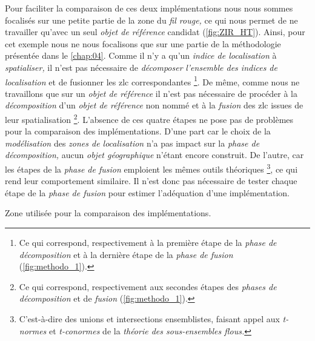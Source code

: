 Pour faciliter la comparaison de ces deux implémentations nous nous
sommes focalisés sur une petite partie de la zone du \emph{fil rouge,}
ce qui nous permet de ne travailler qu'avec un seul \emph{objet de
  référence} candidat (\autoref{fig:ZIR_HT}). Ainsi, pour cet exemple
nous ne nous focalisons que sur une partie de la méthodologie
présentée dans le \autoref{chap:04}. Comme il n'y a qu'un \emph{indice
  de localisation} à \emph{spatialiser,} il n'est pas nécessaire de
\emph{décomposer} \emph{l'ensemble des indices de localisation} et de
fusionner les \ac{zlc} correspondantes \footnote{Ce qui correspond,
  respectivement à la première étape de la \emph{phase de
    décomposition} et à la dernière étape de la \emph{phase de fusion}
  (\autoref{fig:methodo_1}).}. De même, comme nous ne travaillons que
sur un \emph{objet de référence} il n'est pas nécessaire de procéder à
la \emph{décomposition} d'un \emph{objet de référence} non nommé et à
la \emph{fusion} des \ac{zlc} issues de leur spatialisation
\footnote{Ce qui correspond, respectivement aux secondes étapes des
  \emph{phases de décomposition} et de \emph{fusion}
  (\autoref{fig:methodo_1}).}. L'absence de ces quatre étapes ne pose
pas de problèmes pour la comparaison des implémentations. D'une part
car le choix de la \emph{modélisation} des \emph{zones de
  localisation} n'a pas impact sur la \emph{phase de décomposition,}
aucun \emph{objet géographique} n'étant encore construit. De l'autre,
car les étapes de la \emph{phase de fusion} emploient les mêmes outils
théoriques \footnote{C'est-à-dire des unions et intersections
  ensemblistes, faisant appel aux \emph{t-normes} et \emph{t-conormes}
  de la \emph{théorie des sous-ensembles flous.}}, ce qui rend leur
comportement similaire. Il n'est donc pas nécessaire de tester chaque
étape de la \emph{phase de fusion} pour estimer l'adéquation d'une
implémentation.

\begin{carte}
  \centering 
  \caption{Zone utilisée pour la comparaison des implémentations.}
  \label{fig:ZIR_HT}
\end{carte}

